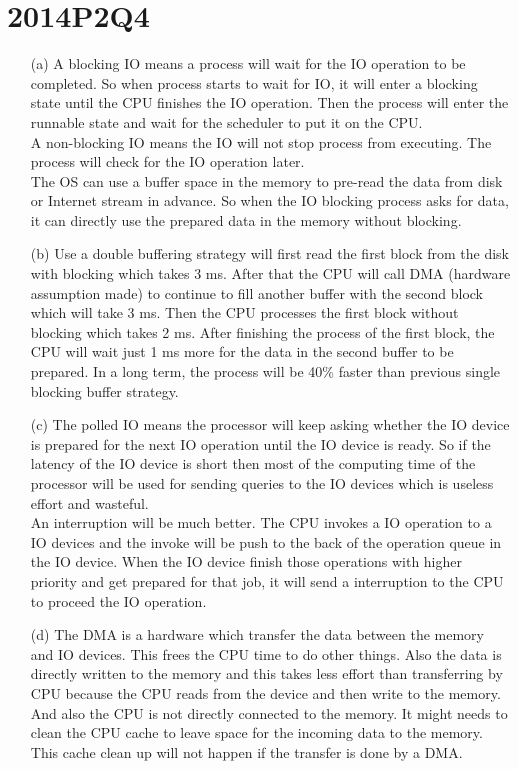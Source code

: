 \documentclass[10pt,twoside,a4paper]{article}
\begin{document}
\section{2014P2Q4}
\begin{itemize}
\item[(a)]
A blocking IO means a process will wait for the IO operation to be completed. So when process starts to wait for IO, it will enter a blocking state until the CPU finishes the IO operation. Then the process will enter the runnable state and wait for the scheduler to put it on the CPU. 
\\A non-blocking IO means the IO will not stop process from executing. The process will check for the IO operation later.
\\The OS can use a buffer space in the memory to pre-read the data from disk or Internet stream in advance. So when the IO blocking process asks for data, it can directly use the prepared data in the memory without blocking.
\item[(b)]
Use a double buffering strategy will first read the first block from the disk with blocking which takes 3 ms. After that the CPU will call DMA (hardware assumption made) to continue to fill another buffer with the second block which will take 3 ms. Then the CPU processes the first block without blocking which takes 2 ms. After finishing the process of the first block, the CPU will wait just 1 ms more for the data in the second buffer to be prepared. In a long term, the process will be 40\% faster than previous single blocking buffer strategy.
\item[(c)]
The polled IO means the processor will keep asking whether the IO device is prepared for the next IO operation until the IO device is ready. So if the latency of the IO device is short then most of the computing time of the processor will be used for sending queries to the IO devices which is useless effort and wasteful.
\\An interruption will be much better. The CPU invokes a IO operation to a IO devices and the invoke will be push to the back of the operation queue in the IO device. When the IO device finish those operations with higher priority and get prepared for that job, it will send a interruption to the CPU to proceed the IO operation.
\item[(d)]
The DMA is a hardware which transfer the data between the memory and IO devices. This frees the CPU time to do other things. Also the data is directly written to the memory and this takes less effort than transferring by CPU because the CPU reads from the device and then write to the memory. And also the CPU is not directly connected to the memory. It might needs to clean the CPU cache to leave space for the incoming data to the memory. This cache clean up will not happen if the transfer is done by a DMA.

\end{itemize}
\end{document}
